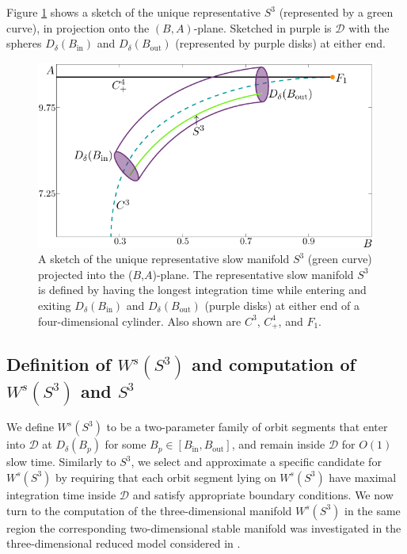 \documentclass{ws-ijbc}
\begin{document}
Figure \ref{figure_2} shows a sketch of the unique representative $S^3$ (represented by a green curve), in projection onto the $(B,A)$-plane.  Sketched in purple is $\mathscr{D}$ with the spheres $D_\delta(B_{\mathrm{in}})$ and $D_\delta(B_{\mathrm{out}})$ (represented by purple disks) at either end.

\begin{figure}[!t]
\begin{center}
\includegraphics{./figures/MKMO_2.pdf}
\end{center}
\caption{A sketch of the unique representative slow manifold $S^3$ (green curve) projected into the ($B$,$A$)-plane.  The representative slow manifold $S^3$ is defined by having the longest integration time while entering and exiting  $D_\delta(B_{\mathrm{in}})$ and $D_\delta(B_{\mathrm{out}})$ (purple disks) at either end of a four-dimensional cylinder.  Also shown are $C^3$, $C^4_+$, and $F_1$.}
\label{figure_2}
\end{figure}

\subsection{Definition of $W^{s}(S^3)$ and computation of $W^{s}(S^3)$ and  $S^3$}

We define $W^{s}(S^3)$ to be a two-parameter family of orbit segments that enter into $\mathscr{D}$ at $D_{\delta}(B_p)$ for some $B_p \in [B_{\text{in}}, B_{\text{out}}]$, and remain inside $\mathscr{D}$ for $O(1)$ slow time.  Similarly to $S^3$, we select and approximate a specific candidate for $W^{s}(S^3)$ by requiring that each orbit segment lying on $W^{s}(S^3)$ have maximal integration time inside $\mathscr{D}$ and satisfy appropriate boundary conditions.  We now turn to the computation of the three-dimensional manifold $W^{s}(S^3)$ in the same region the corresponding two-dimensional stable manifold was investigated in the three-dimensional reduced model considered in \cite{QSSA}.
     
\end{document}

